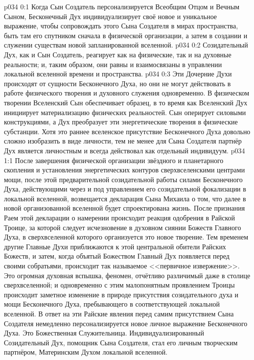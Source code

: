 \author{Могущественный Посланник}
\vs p034 0:1 Когда Сын Создатель персонализируется Всеобщим Отцом и Вечным Сыном, Бесконечный Дух индивидуализирует своё новое и уникальное выражение, чтобы сопровождать этого Сына Создателя в мирах пространства, быть там его спутником сначала в физической организации, а затем в создании и служении существам новой запланированной вселенной.
\vs p034 0:2 Созидательный Дух, как и Сын Создатель, реагирует как на физические, так и на духовные реальности; и, таким образом, они равны и взаимосвязаны в управлении локальной вселенной времени и пространства.
\vs p034 0:3 Эти Дочерние Духи происходят от сущности Бесконечного Духа, но они не могут действовать в работе физического творения и духовного служения одновременно. В физическом творении Вселенский Сын обеспечивает образец, в то время как Вселенский Дух инициирует материализацию физических реальностей. Сын оперирует силовыми конструкциями, а Дух преобразует эти энергетические творения в физические субстанции. Хотя это раннее вселенское присутствие Бесконечного Духа довольно сложно изобразить в виде личности, тем не менее для Сына Создателя партнёр Дух является личностным и всегда действовал как отдельный индивидуум.
\vs p034 1:1 После завершения физической организации звёздного и планетарного скопления и установления энергетических контуров сверхвселенскими центрами мощи, после этой предварительной созидательной работы силами Бесконечного Духа, действующими через и под управлением его созидательной фокализации в локальной вселенной, возвещается декларация Сына Михаила о том, что далее в новой организованной вселенной будет спроектирована жизнь. После признания Раем этой декларации о намерении происходит реакция одобрения в Райской Троице, за которой следует исчезновение в духовном сиянии Божеств Главного Духа, в сверхвселенной которого организуется это новое творение. Тем временем другие Главные Духи приближаются к этой центральной обители  Райских Божеств, и затем, когда объятый Божеством Главный Дух появляется перед своими собратьями, происходит так называемое <<первичное извержение>>. Это огромная духовная вспышка, феномен, отчётливо различимый даже в столице сверхвселенной; и одновременно с этим малопонятным проявлением Троицы происходит заметное изменение в природе присутствия созидательного духа и мощи Бесконечного Духа, пребывающего в соответствующей локальной вселенной. В ответ на эти Райские явления перед самим присутствием Сына Создателя немедленно персонализируется новое личное выражение Бесконечного Духа. Это Божественная Служительница. Индивидуализированный Созидательный Дух, помощник Сына Создателя, стал его личным творческим партнёром, Материнским Духом локальной вселенной.
